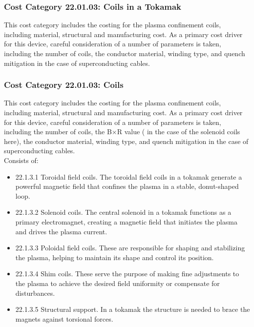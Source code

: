 
\subsubsection*{Cost Category 22.01.03: Coils in a Tokamak}

This cost category includes the costing for the plasma confinement coils, including  material, structural and manufacturing cost. As a primary cost driver for this device, careful consideration of a number of parameters is taken, including the number of coils, the conductor material, winding type, and quench mitigation in the case of superconducting cables.\\

\subsubsection*{Cost Category 22.01.03: Coils}

This cost category includes the costing for the plasma confinement coils, including  material, structural and manufacturing cost. As a primary cost driver for this device, careful consideration of a number of parameters is taken, including the number of coils, the B$\times$R value ( in the case of the solenoid coils here), the conductor material, winding type, and quench mitigation in the case of superconducting cables.\\

Consists of:

\begin{itemize}
    \item 22.1.3.1 Toroidal field coils. The toroidal field coils in a tokamak generate a powerful magnetic field that confines the plasma in a stable, donut-shaped loop.
    \item 22.1.3.2 Solenoid coils. The central solenoid in a tokamak functions as a primary electromagnet, creating a magnetic field that initiates the plasma and drives the plasma current.
    \item 22.1.3.3 Poloidal field coils. These are responsible for shaping and stabilizing the plasma, helping to maintain its shape and control its position.
    \item 22.1.3.4 Shim coils. These serve the purpose of making fine adjustments to the plasma to achieve the desired field uniformity or compensate for disturbances.
    \item 22.1.3.5 Structural support. In a tokamak the structure is needed to brace the magnets against torsional forces.
\end{itemize}



